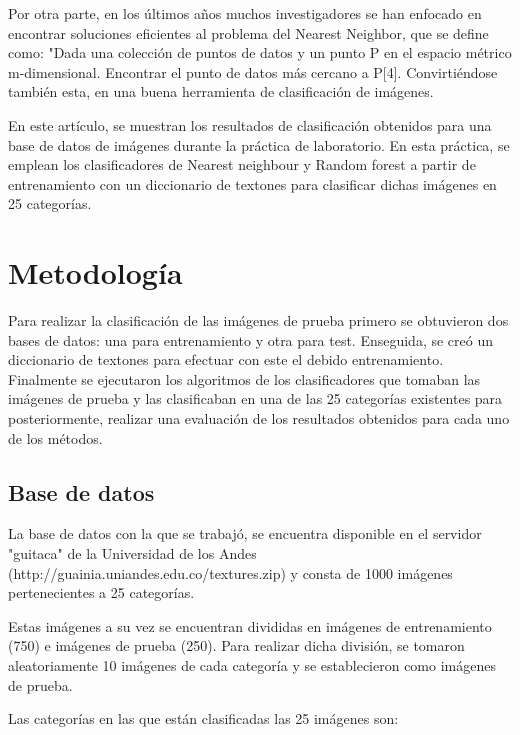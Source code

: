 \documentclass[10pt,twocolumn,letterpaper]{article}
\begin{document}
Por otra parte, en los últimos años muchos investigadores se han enfocado en encontrar soluciones eficientes al problema del Nearest Neighbor, que se define como: "Dada una colección de puntos de datos y un punto P en el espacio métrico m-dimensional. Encontrar el punto de datos más cercano a P[4]. Convirtiéndose también esta, en una buena herramienta de clasificación de imágenes.

En este artículo, se muestran los resultados de clasificación obtenidos para una base de datos de imágenes durante la práctica de laboratorio. En esta práctica, se emplean los clasificadores de Nearest neighbour y Random forest a partir de entrenamiento con un diccionario de textones para clasificar dichas imágenes en 25 categorías.
\section{Metodología}

Para realizar la clasificación de las imágenes de prueba primero se obtuvieron dos bases de datos: una para entrenamiento y otra para test. Enseguida, se creó un diccionario de textones para efectuar con este el debido entrenamiento. Finalmente se ejecutaron los algoritmos de los clasificadores que tomaban las imágenes de prueba y las clasificaban en una de las 25 categorías existentes para posteriormente, realizar una evaluación de los resultados obtenidos para cada uno de los métodos.

\subsection{Base de datos}

La base de datos con la que se trabajó, se encuentra disponible en el servidor "guitaca" de la Universidad de los Andes (http://guainia.uniandes.edu.co/textures.zip) y consta de 1000 imágenes pertenecientes a 25 categorías.

Estas imágenes a su vez se encuentran divididas en imágenes de entrenamiento (750) e imágenes de prueba (250). Para realizar dicha división, se tomaron aleatoriamente 10 imágenes de cada categoría y se establecieron como imágenes de prueba.

Las categorías en las que están clasificadas las 25 imágenes son:
\end{document}
